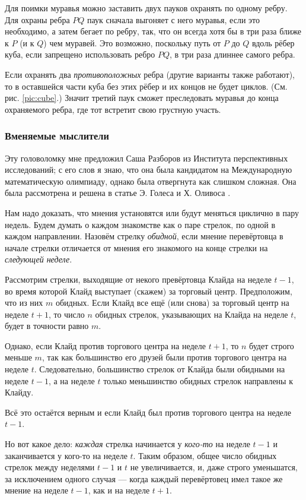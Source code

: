 Для поимки муравья можно заставить двух пауков охранять по одному ребру.
Для охраны ребра $PQ$ паук сначала выгоняет с него муравья, если это необходимо, а затем бегает по ребру, так, что он всегда хотя бы в три раза ближе к $P$ (и к $Q$) чем муравей.
Это возможно, поскольку путь от $P$ до $Q$ вдоль рёбер куба, если запрещено использовать ребро $PQ$, в три раза длиннее самого ребра.

Если охранять два \emph{противоположных} ребра (другие варианты также работают), то в оставшейся части куба без этих рёбер и их концов не будет циклов. 
(См. рис. \ref{pic:cube}.)
Значит третий паук сможет преследовать муравья до конца охраняемого ребра, где тот встретит свою грустную участь.

\subsubsection*{Вменяемые мыслители}

Эту головоломку мне предложил Саша Разборов из Института перспективных исследований;
с его слов я знаю, что она была кандидатом на Международную математическую олимпиаду, однако была отвергнута как слишком сложная.
Она была рассмотрена и решена в статье Э. Голеса и Х. Оливоса \cite{31}.

Нам надо доказать, что мнения установятся или будут меняться циклично в пару недель.
Будем думать о каждом знакомстве как о паре стрелок, по одной в каждом направлении.
Назовём стрелку \emph{обидной}, если мнение перевёртовца в начале стрелки отличается от мнения его знакомого на конце стрелки на \emph{следующей неделе}.

Рассмотрим стрелки, выходящие от некого превёртовца Клайда на неделе $t - 1$, во время которой Клайд выступает (скажем) за торговый центр.
Предположим, что из них $m$ обидных.
Если Клайд все ещё (или снова) за торговый центр на неделе $t + 1$, то число $n$ обидных стрелок, указывающих на Клайда на неделе $t$, будет в точности равно $m$.

Однако, если Клайд против торгового центра на неделе $t + 1$, то $n$ будет строго меньше $m$, так как большинство его друзей были против торгового центра на неделе $t$.
Следовательно, большинство стрелок от Клайда были обидными на неделе $t - 1$, а на неделе $t$ только меньшинство обидных стрелок направлены к Клайду.

Всё это остаётся верным и если Клайд был против торгового центра на неделе $t - 1$.

Но вот какое дело: \emph{каждая} стрелка начинается у \emph{кого-то} на неделе $t - 1$ и заканчивается у кого-то на неделе $t$.
Таким образом, общее число обидных стрелок между неделями $t - 1$ и $t$ не увеличивается, и, даже строго уменьшатся, за исключением одного случая --- когда каждый перевёртовец имел такое же мнение на неделе $t - 1$, как и на неделе $t + 1$.

